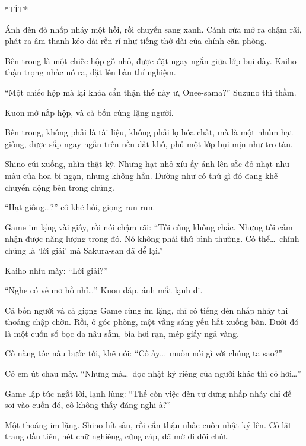 \documentclass[../main.tex]{subfiles}
\begin{document}
*TÍT*

Ánh đèn đỏ nhấp nháy một hồi, rồi chuyển sang xanh. Cánh cửa mở ra chậm rãi, phát ra âm thanh kéo dài rền rĩ như tiếng thở dài của chính căn phòng.

Bên trong là một chiếc hộp gỗ nhỏ, được đặt ngay ngắn giữa lớp bụi dày. Kaiho thận trọng nhấc nó ra, đặt lên bàn thí nghiệm.

``Một chiếc hộp mà lại khóa cẩn thận thế này ư, Onee-sama?'' Suzuno thì thầm.

Kuon mở nắp hộp, và cả bốn cùng lặng người.

Bên trong, không phải là tài liệu, không phải lọ hóa chất, mà là một nhúm hạt giống, được sắp ngay ngắn trên nền đất khô, phủ một lớp bụi mịn như tro tàn.

Shino cúi xuống, nhìn thật kỹ. Những hạt nhỏ xíu ấy ánh lên sắc đỏ nhạt như màu của hoa bỉ ngạn, nhưng không hẳn. Dường như có thứ gì đó đang khẽ chuyển động bên trong chúng.

``Hạt giống\dots?'' cô khẽ hỏi, giọng run run.

Game im lặng vài giây, rồi nói chậm rãi: ``Tôi cũng không chắc. Nhưng tôi cảm nhận được năng lượng trong đó. Nó không phải thứ bình thường. Có thể\dots\ chính chúng là `lời giải' mà Sakura-san đã để lại.''

Kaiho nhíu mày: ``Lời giải?''

``Nghe có vẻ mơ hồ nhỉ\dots'' Kuon đáp, ánh mắt lạnh đi.

Cả bốn người và cả giọng Game cùng im lặng, chỉ có tiếng đèn nhấp nháy thi thoảng chập chờn. Rồi, ở góc phòng, một vầng sáng yếu hắt xuống bàn. Dưới đó là một cuốn sổ bọc da nâu sẫm, bìa hơi rạn, mép giấy ngả vàng.


Cô nàng tóc nâu bước tới, khẽ nói: ``Cô ấy\dots\ muốn nói gì với chúng ta sao?''

Cô em út chau mày. ``Nhưng mà\dots\ đọc nhật ký riêng của người khác thì có hơi\dots''

Game lập tức ngắt lời, lạnh lùng: ``Thế còn việc đèn tự dưng nhấp nháy chỉ để soi vào cuốn đó, cô không thấy đáng nghi à?''

Một thoáng im lặng. Shino hít sâu, rồi cẩn thận nhấc cuốn nhật ký lên. Cô lật trang đầu tiên, nét chữ nghiêng, cứng cáp, đã mờ đi đôi chút.

\end{document}
